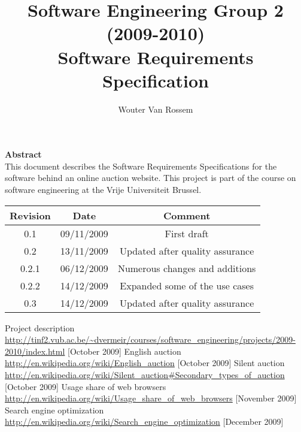 \documentclass{report}
\begin{document}
\title{Software Engineering Group 2 (2009-2010) \\ Software Requirements Specification}
\author{Wouter Van Rossem}

\maketitle
\begin{center}
	\textbf{Abstract} \\
	This document describes the Software Requirements Specifications for
	the software behind an online auction website. This project is part of 
	the course on software engineering at the Vrije Universiteit Brussel.
	\bigskip
\begin{tabular}{|c|c|c|}
	\hline  \textbf{Revision} & \textbf{Date} & \textbf{Comment} \\ 
	\hline 0.1 & 09/11/2009 & First draft \\ 
	\hline 0.2 & 13/11/2009 & Updated after quality assurance \\ 
	\hline 0.2.1 & 06/12/2009 & Numerous changes and additions \\ 
	\hline 0.2.2 & 14/12/2009 & Expanded some of the use cases \\
	\hline 0.3 & 14/12/2009 & Updated after quality assurance \\
	\hline 
\end{tabular} 
\end{center}
\tableofcontents








\begin{thebibliography}{9}
 Project description \\		
	\url{http://tinf2.vub.ac.be/~dvermeir/courses/software_engineering/projects/2009-2010/index.html} [October 2009]
 English auction \\ 
	\url{http://en.wikipedia.org/wiki/English_auction} [October 2009]
 Silent auction \\
	\url{http://en.wikipedia.org/wiki/Silent_auction#Secondary_types_of_auction} [October 2009]
 Usage share of web browsers \\
	\url{http://en.wikipedia.org/wiki/Usage_share_of_web_browsers} [November 2009]
 Search engine optimization \\
	\url{http://en.wikipedia.org/wiki/Search_engine_optimization} [December 2009]
\end{thebibliography}

\end{document}
